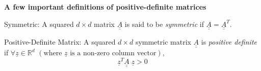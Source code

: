 \begin{shaded}
  \begin{center} {\bf A few important definitions of positive-definite matrices}\end{center}
\begin{defn}{Symmetric:}\label{Def:Symmetric} A squared $d\times d$ matrix $\underline{\underline{A}}$ is said to be {\it symmetric} if $\underline{\underline{A}} = \underline{\underline{A}}^{T}$.
\end{defn}
%
\begin{defn}{Positive-Definite Matrix:}\label{Def:PositiveDefinite} A squared $d\times d$ symmetric matrix $\underline{\underline{A}}$ is {\it positive definite} if $\forall \underline{z}\in\mathbb{R}^{d}$ $\left(\text{where }\underline{z}\text{ is a non-zero column vector}\right)$,
  \begin{equation}
    \underline{z}^{T}\underline{\underline{A}}\; \underline{z} > 0
  \end{equation}
\end{defn}
\medskip


\end{shaded}
